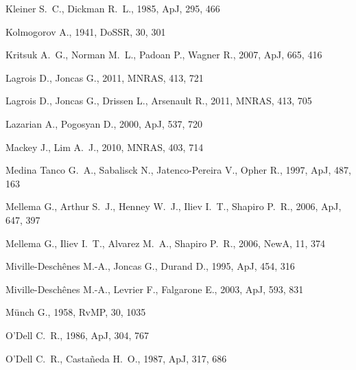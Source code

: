 \documentclass[useAMS,usenatbib]{mn2e}
\begin{document}
\begin{thebibliography}{}
 Kleiner S.~C., Dickman R.~L., 1985, ApJ, 295, 466 

Kolmogorov A., 1941, DoSSR, 30, 301 

 Kritsuk A.~G., Norman M.~L., Padoan
  P., Wagner R., 2007, ApJ, 665, 416 

 Lagrois D., Joncas G., 2011, MNRAS, 413, 721 

 Lagrois D., Joncas G., Drissen L., 
Arsenault R., 2011, MNRAS, 413, 705 

 Lazarian A., Pogosyan D., 2000, ApJ, 537, 720 

 Mackey J., Lim A.~J., 2010, MNRAS, 403, 714 

 Medina Tanco G.~A., Sabalisck N., 
Jatenco-Pereira V., Opher R., 1997, ApJ, 487, 163 


 Mellema G., Arthur S.~J., Henney W.~J., 
Iliev I.~T., Shapiro P.~R., 2006, ApJ, 647, 397 

 Mellema G., Iliev I.~T., Alvarez M.~A., 
Shapiro P.~R., 2006, NewA, 11, 374 

 Miville-Desch{\^e}nes M.-A., Joncas G., Durand D., 1995, ApJ, 454, 316 

 Miville-Desch{\^e}nes M.-A., Levrier F., Falgarone E., 2003, ApJ, 593, 831 

M{\"u}nch G., 1958, RvMP, 30, 1035 

 O'Dell 
C.~R., 1986, ApJ, 304, 767 

 O'Dell C.~R., Casta\~neda H.~O., 1987, ApJ, 317, 686 


\end{thebibliography}
\end{document}
